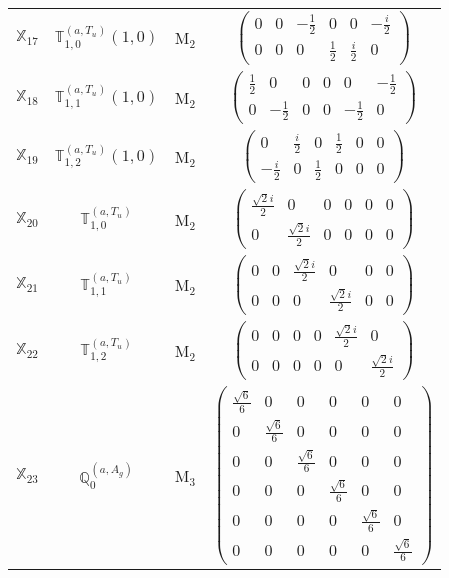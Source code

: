 \documentclass[fleqn,10pt,landscape]{article}
\begin{document}
\begin{itemize}
\begin{center}
\begin{longtable}{c|c|c|c}
$ \mathbb{X}_{17} $ & $\mathbb{T}_{1,0}^{(a,T_{u})}(1,0)$ & M$_{2}$ & $\begin{pmatrix} 0 & 0 & - \frac{1}{2} & 0 & 0 & - \frac{i}{2} \\ 0 & 0 & 0 & \frac{1}{2} & \frac{i}{2} & 0 \end{pmatrix}$ \\
$ \mathbb{X}_{18} $ & $\mathbb{T}_{1,1}^{(a,T_{u})}(1,0)$ & M$_{2}$ & $\begin{pmatrix} \frac{1}{2} & 0 & 0 & 0 & 0 & - \frac{1}{2} \\ 0 & - \frac{1}{2} & 0 & 0 & - \frac{1}{2} & 0 \end{pmatrix}$ \\
$ \mathbb{X}_{19} $ & $\mathbb{T}_{1,2}^{(a,T_{u})}(1,0)$ & M$_{2}$ & $\begin{pmatrix} 0 & \frac{i}{2} & 0 & \frac{1}{2} & 0 & 0 \\ - \frac{i}{2} & 0 & \frac{1}{2} & 0 & 0 & 0 \end{pmatrix}$ \\
$ \mathbb{X}_{20} $ & $\mathbb{T}_{1,0}^{(a,T_{u})}$ & M$_{2}$ & $\begin{pmatrix} \frac{\sqrt{2} i}{2} & 0 & 0 & 0 & 0 & 0 \\ 0 & \frac{\sqrt{2} i}{2} & 0 & 0 & 0 & 0 \end{pmatrix}$ \\
$ \mathbb{X}_{21} $ & $\mathbb{T}_{1,1}^{(a,T_{u})}$ & M$_{2}$ & $\begin{pmatrix} 0 & 0 & \frac{\sqrt{2} i}{2} & 0 & 0 & 0 \\ 0 & 0 & 0 & \frac{\sqrt{2} i}{2} & 0 & 0 \end{pmatrix}$ \\
$ \mathbb{X}_{22} $ & $\mathbb{T}_{1,2}^{(a,T_{u})}$ & M$_{2}$ & $\begin{pmatrix} 0 & 0 & 0 & 0 & \frac{\sqrt{2} i}{2} & 0 \\ 0 & 0 & 0 & 0 & 0 & \frac{\sqrt{2} i}{2} \end{pmatrix}$ \\ \hline
$ \mathbb{X}_{23} $ & $\mathbb{Q}_{0}^{(a,A_{g})}$ & M$_{3}$ & $\begin{pmatrix} \frac{\sqrt{6}}{6} & 0 & 0 & 0 & 0 & 0 \\ 0 & \frac{\sqrt{6}}{6} & 0 & 0 & 0 & 0 \\ 0 & 0 & \frac{\sqrt{6}}{6} & 0 & 0 & 0 \\ 0 & 0 & 0 & \frac{\sqrt{6}}{6} & 0 & 0 \\ 0 & 0 & 0 & 0 & \frac{\sqrt{6}}{6} & 0 \\ 0 & 0 & 0 & 0 & 0 & \frac{\sqrt{6}}{6} \end{pmatrix}$ \\

\end{longtable}
\end{center}
\end{itemize}
\end{document}
